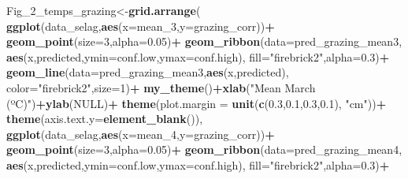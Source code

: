 \documentclass[
]{article}
\newenvironment{Shaded}{\begin{snugshade}}{\end{snugshade}}
\newcommand{\DataTypeTok}[1]{\textcolor[rgb]{0.13,0.29,0.53}{#1}}
\newcommand{\DecValTok}[1]{\textcolor[rgb]{0.00,0.00,0.81}{#1}}
\newcommand{\FloatTok}[1]{\textcolor[rgb]{0.00,0.00,0.81}{#1}}
\newcommand{\KeywordTok}[1]{\textcolor[rgb]{0.13,0.29,0.53}{\textbf{#1}}}
\newcommand{\NormalTok}[1]{#1}
\newcommand{\OperatorTok}[1]{\textcolor[rgb]{0.81,0.36,0.00}{\textbf{#1}}}
\newcommand{\OtherTok}[1]{\textcolor[rgb]{0.56,0.35,0.01}{#1}}
\newcommand{\StringTok}[1]{\textcolor[rgb]{0.31,0.60,0.02}{#1}}
\begin{document}
\begin{Shaded}
\begin{Highlighting}[]
\NormalTok{Fig\_}\DecValTok{2}\NormalTok{\_temps\_grazing\textless{}{-}}\KeywordTok{grid.arrange}\NormalTok{(}
  \KeywordTok{ggplot}\NormalTok{(data\_selag,}\KeywordTok{aes}\NormalTok{(}\DataTypeTok{x=}\NormalTok{mean\_}\DecValTok{3}\NormalTok{,}\DataTypeTok{y=}\NormalTok{grazing\_corr))}\OperatorTok{+}
\StringTok{    }\KeywordTok{geom\_point}\NormalTok{(}\DataTypeTok{size=}\DecValTok{3}\NormalTok{,}\DataTypeTok{alpha=}\FloatTok{0.05}\NormalTok{)}\OperatorTok{+}
\StringTok{    }\KeywordTok{geom\_ribbon}\NormalTok{(}\DataTypeTok{data=}\NormalTok{pred\_grazing\_mean3,}
                \KeywordTok{aes}\NormalTok{(x,predicted,}\DataTypeTok{ymin=}\NormalTok{conf.low,}\DataTypeTok{ymax=}\NormalTok{conf.high),}
                \DataTypeTok{fill=}\StringTok{"firebrick2"}\NormalTok{,}\DataTypeTok{alpha=}\FloatTok{0.3}\NormalTok{)}\OperatorTok{+}
\StringTok{    }\KeywordTok{geom\_line}\NormalTok{(}\DataTypeTok{data=}\NormalTok{pred\_grazing\_mean3,}\KeywordTok{aes}\NormalTok{(x,predicted),}
              \DataTypeTok{color=}\StringTok{"firebrick2"}\NormalTok{,}\DataTypeTok{size=}\DecValTok{1}\NormalTok{)}\OperatorTok{+}
\StringTok{    }\KeywordTok{my\_theme}\NormalTok{()}\OperatorTok{+}\KeywordTok{xlab}\NormalTok{(}\StringTok{"Mean March (ºC)"}\NormalTok{)}\OperatorTok{+}\KeywordTok{ylab}\NormalTok{(}\OtherTok{NULL}\NormalTok{)}\OperatorTok{+}
\StringTok{    }\KeywordTok{theme}\NormalTok{(}\DataTypeTok{plot.margin =} \KeywordTok{unit}\NormalTok{(}\KeywordTok{c}\NormalTok{(}\FloatTok{0.3}\NormalTok{,}\FloatTok{0.1}\NormalTok{,}\FloatTok{0.3}\NormalTok{,}\FloatTok{0.1}\NormalTok{), }\StringTok{"cm"}\NormalTok{))}\OperatorTok{+}
\StringTok{    }\KeywordTok{theme}\NormalTok{(}\DataTypeTok{axis.text.y=}\KeywordTok{element\_blank}\NormalTok{()),}
  \KeywordTok{ggplot}\NormalTok{(data\_selag,}\KeywordTok{aes}\NormalTok{(}\DataTypeTok{x=}\NormalTok{mean\_}\DecValTok{4}\NormalTok{,}\DataTypeTok{y=}\NormalTok{grazing\_corr))}\OperatorTok{+}
\StringTok{    }\KeywordTok{geom\_point}\NormalTok{(}\DataTypeTok{size=}\DecValTok{3}\NormalTok{,}\DataTypeTok{alpha=}\FloatTok{0.05}\NormalTok{)}\OperatorTok{+}
\StringTok{    }\KeywordTok{geom\_ribbon}\NormalTok{(}\DataTypeTok{data=}\NormalTok{pred\_grazing\_mean4,}
                \KeywordTok{aes}\NormalTok{(x,predicted,}\DataTypeTok{ymin=}\NormalTok{conf.low,}\DataTypeTok{ymax=}\NormalTok{conf.high),}
                \DataTypeTok{fill=}\StringTok{"firebrick2"}\NormalTok{,}\DataTypeTok{alpha=}\FloatTok{0.3}\NormalTok{)}\OperatorTok{+}

\end{Highlighting}
\end{Shaded}
\end{document}
